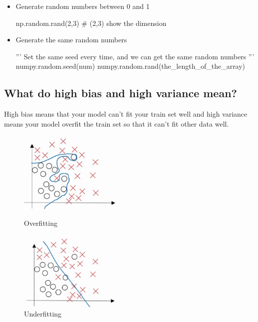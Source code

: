 \documentclass{article}
\begin{document}
\begin{enumerate}
\begin{itemize}
\item Generate random numbers between 0 and 1
\begin{python}
np.random.rand(2,3) # (2,3) show the dimension
\end{python}

\item Generate the same random numbers
\begin{python}
'''
Set the same seed every time,
and we can get the same random numbers
'''
numpy.random.seed(num)
numpy.random.rand(the_length_of_the_array)
\end{python}

\end{itemize}


\end{enumerate} 

\subsection{What do high bias and high variance mean?}
\indent High bias means that your model can't fit your train set well and high variance means your model overfit the train set so that it can't fit other data well.

\begin{figure}[htbp]

\begin{minipage}[t]{0.45\linewidth}
\centering
\includegraphics[width=5cm]{overfit.png}
\caption{Overfitting}
\label{overfitting}
\end{minipage}
\hfill %
\begin{minipage}[t]{0.45\linewidth}
\centering
\includegraphics[width=5cm]{underfitting.png}
\caption{Underfitting}
\label{underfitting}
\end{minipage}
\end{figure}
\end{document}
